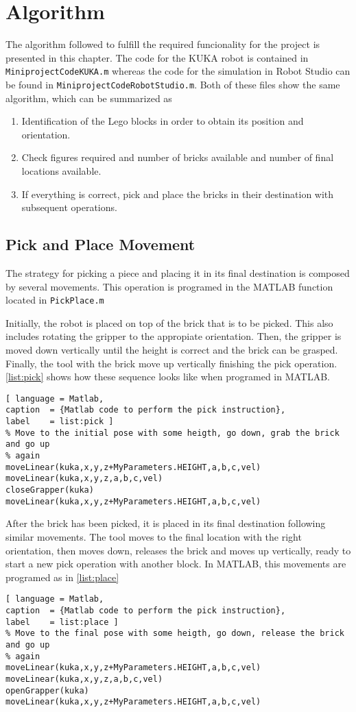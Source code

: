 \chapter{Algorithm}\label{chap:algorithm}
The algorithm followed to fulfill the required funcionality for the project is presented in this chapter. The code for the KUKA robot is contained in \lstinline[style=Matlabinline]{MiniprojectCodeKUKA.m} whereas the code for the simulation in Robot Studio can be found in \lstinline[style=Matlabinline]{MiniprojectCodeRobotStudio.m}. Both of these files show the same algorithm, which can be summarized as
\begin{enumerate}
	\item Identification of the Lego blocks in order to obtain its position and orientation.
	\item Check figures required and number of bricks available and number of final locations available. 
	\item If everything is correct, pick and place the bricks in their destination with subsequent operations.
\end{enumerate}

\section{Pick and Place Movement}
The strategy for picking a piece and placing it in its final destination is composed by several movements. This operation is programed in the MATLAB function located in \lstinline[style=Matlabinline]{PickPlace.m}

Initially, the robot is placed on top of the brick that is to be picked. This also includes rotating the gripper to the appropiate orientation. Then, the gripper is moved down vertically until the height is correct and the brick can be grasped. Finally, the tool with the brick move up vertically finishing the pick operation. \autoref{list:pick} shows how these sequence looks like when programed in MATLAB.
\begin{lstlisting}[ language = Matlab,
caption  = {Matlab code to perform the pick instruction},
label    = list:pick ]
% Move to the initial pose with some heigth, go down, grab the brick and go up
% again
moveLinear(kuka,x,y,z+MyParameters.HEIGHT,a,b,c,vel)
moveLinear(kuka,x,y,z,a,b,c,vel)
closeGrapper(kuka)
moveLinear(kuka,x,y,z+MyParameters.HEIGHT,a,b,c,vel)
\end{lstlisting}

After the brick has been picked, it is placed in its final destination following similar movements. The tool moves to the final location with the right orientation, then moves down, releases the brick and moves up vertically, ready to start a new pick operation with another block. In MATLAB, this movements are programed as in \autoref{list:place}
\begin{lstlisting}[ language = Matlab,
caption  = {Matlab code to perform the pick instruction},
label    = list:place ]
% Move to the final pose with some heigth, go down, release the brick and go up
% again
moveLinear(kuka,x,y,z+MyParameters.HEIGHT,a,b,c,vel)
moveLinear(kuka,x,y,z,a,b,c,vel)
openGrapper(kuka)
moveLinear(kuka,x,y,z+MyParameters.HEIGHT,a,b,c,vel)
\end{lstlisting}